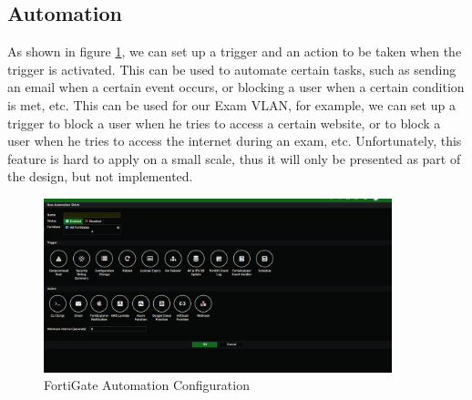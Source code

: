 \documentclass[12pt]{report}
\begin{document}
\subsection{Automation}
As shown in figure \ref{fig:auto}, we can set up a trigger and an action to be taken when the trigger is activated. This can be used to automate certain tasks, such as sending an email when a certain event occurs, or blocking a user when a certain condition is met, etc. This can be used for our Exam VLAN, for example, we can set up a trigger to block a user when he tries to access a certain website, or to block a user when he tries to access the internet during an exam, etc. Unfortunately, this feature is hard to apply on a small scale, thus it will only be presented as part of the design, but not implemented.
\begin{figure}
    \centering
    \includegraphics[width=0.9\textwidth]{images/Implementation/auto.png}
    \caption{FortiGate Automation Configuration}
    \label{fig:auto}
\end{figure}


\end{document}
